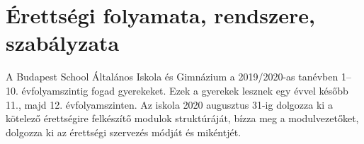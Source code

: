 \section{Érettségi folyamata, rendszere, szabályzata}
A Budapest School Általános Iskola és Gimnázium a 2019/2020-as tanévben 1--10. évfolyamszintig fogad gyerekeket. Ezek a gyerekek lesznek egy évvel később 11., majd 12. évfolyamszinten. Az iskola 2020 augusztus 31-ig dolgozza ki a kötelező érettségire felkészítő modulok struktúráját, bízza meg a modulvezetőket, dolgozza ki az érettségi szervezés módját és mikéntjét. 